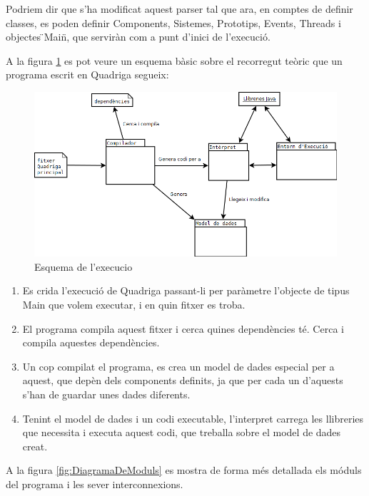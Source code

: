   Podriem dir que s'ha modificat aquest parser tal que ara, en comptes de definir classes, es poden definir Components, Sistemes, Prototips, Events, Threads i objectes \"{}Main\"{}, que serviràn com a punt d'inici de l'execució.
  
  A la figura \ref{fig:EsquemaExecucio} es pot veure un esquema bàsic sobre el recorregut teòric que un programa escrit en Quadriga segueix:
  
  \begin{figure}
    \includegraphics[width=1\linewidth]{./img/EsquemaExecucio.png}
    \caption{Esquema de l'execucio \label{fig:EsquemaExecucio}}
  \end{figure}
  
  \begin{enumerate}
    \item Es crida l'execució de Quadriga passant-li per paràmetre l'objecte de tipus Main que volem executar, i en quin fitxer es troba.
    \item El programa compila aquest fitxer i cerca quines dependències té. Cerca i compila aquestes dependències.
    \item Un cop compilat el programa, es crea un model de dades especial per a aquest, que depèn dels components definits, ja que per cada un d'aquests s'han de guardar unes dades diferents.
    \item Tenint el model de dades i un codi executable, l'interpret carrega les llibreries que necessita i executa aquest codi, que treballa sobre el model de dades creat.
  \end{enumerate}
  
  A la figura \ref{fig:DiagramaDeModuls} es mostra de forma més detallada els móduls del programa i les sever interconnexions.

